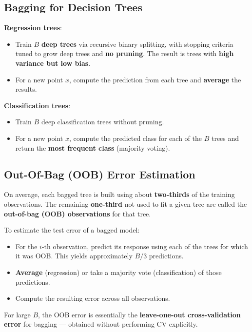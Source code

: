 \documentclass[11pt,a4paper]{article}
\theoremstyle{definition}
\theoremstyle{plain}
\theoremstyle{remark}
\begin{document}
\subsection{Bagging for Decision Trees}

\textbf{Regression trees}:
\begin{itemize}
    \item Train $B$ \textbf{deep trees} via recursive binary splitting, with stopping criteria tuned to grow deep trees and \textbf{no pruning}. The result is trees with \textbf{high variance but low bias}.
    \item For a new point $x$, compute the prediction from each tree and \textbf{average} the results.
\end{itemize}
\textbf{Classification trees}:
\begin{itemize}
    \item Train $B$ deep classification trees without pruning.
    \item For a new point $x$, compute the predicted class for each of the $B$ trees and return the \textbf{most frequent class} (majority voting).
\end{itemize}

\subsection{Out-Of-Bag (OOB) Error Estimation}

\begin{tcolorbox}[colback=blue!5!white,colframe=blue!75!black,title=\textbf{OOB Error}]
On average, each bagged tree is built using about \textbf{two-thirds} of the training observations. The remaining \textbf{one-third} not used to fit a given tree are called the \textbf{out-of-bag (OOB) observations} for that tree.
\end{tcolorbox}

To estimate the test error of a bagged model:
\begin{itemize}
    \item For the $i$-th observation, predict its response using each of the trees for which it was OOB. This yields approximately $B/3$ predictions.
    \item \textbf{Average} (regression) or take a majority vote (classification) of those predictions.
    \item Compute the resulting error across all observations.
\end{itemize}
For large $B$, the OOB error is essentially the \textbf{leave-one-out cross-validation error} for bagging — obtained without performing CV explicitly.
\end{document}

